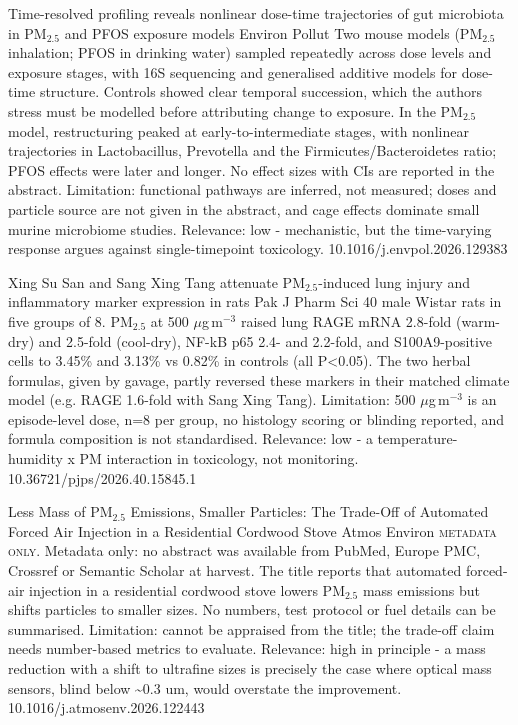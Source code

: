 \documentclass[10pt]{article}
\begin{document}
{Time-resolved profiling reveals nonlinear dose-time trajectories of gut microbiota in PM$_{2.5}$ and PFOS exposure models}
{Environ Pollut}
{Two mouse models (PM$_{2.5}$ inhalation; PFOS in drinking water) sampled repeatedly across dose levels and exposure stages, with 16S sequencing and generalised additive models for dose-time structure. Controls showed clear temporal succession, which the authors stress must be modelled before attributing change to exposure. In the PM$_{2.5}$ model, restructuring peaked at early-to-intermediate stages, with nonlinear trajectories in Lactobacillus, Prevotella and the Firmicutes/Bacteroidetes ratio; PFOS effects were later and longer. No effect sizes with CIs are reported in the abstract. Limitation: functional pathways are inferred, not measured; doses and particle source are not given in the abstract, and cage effects dominate small murine microbiome studies. Relevance: low - mechanistic, but the time-varying response argues against single-timepoint toxicology.}
{10.1016/j.envpol.2026.129383}

{Xing Su San and Sang Xing Tang attenuate PM$_{2.5}$-induced lung injury and inflammatory marker expression in rats}
{Pak J Pharm Sci}
{40 male Wistar rats in five groups of 8. PM$_{2.5}$ at 500 $\mu$g\,m$^{-3}$ raised lung RAGE mRNA 2.8-fold (warm-dry) and 2.5-fold (cool-dry), NF-kB p65 2.4- and 2.2-fold, and S100A9-positive cells to 3.45\% and 3.13\% vs 0.82\% in controls (all P<0.05). The two herbal formulas, given by gavage, partly reversed these markers in their matched climate model (e.g. RAGE 1.6-fold with Sang Xing Tang). Limitation: 500 $\mu$g\,m$^{-3}$ is an episode-level dose, n=8 per group, no histology scoring or blinding reported, and formula composition is not standardised. Relevance: low - a temperature-humidity x PM interaction in toxicology, not monitoring.}
{10.36721/pjps/2026.40.15845.1}

\par{}\baselineskip{}\baselineskip
{}

{Less Mass of PM$_{2.5}$ Emissions, Smaller Particles: The Trade-Off of Automated Forced Air Injection in a Residential Cordwood Stove}
{Atmos Environ}
{\textsc{metadata only.} Metadata only: no abstract was available from PubMed, Europe PMC, Crossref or Semantic Scholar at harvest. The title reports that automated forced-air injection in a residential cordwood stove lowers PM$_{2.5}$ mass emissions but shifts particles to smaller sizes. No numbers, test protocol or fuel details can be summarised. Limitation: cannot be appraised from the title; the trade-off claim needs number-based metrics to evaluate. Relevance: high in principle - a mass reduction with a shift to ultrafine sizes is precisely the case where optical mass sensors, blind below \textasciitilde{}0.3 um, would overstate the improvement.}
{10.1016/j.atmosenv.2026.122443}
\end{document}

